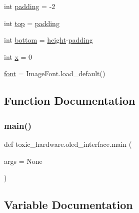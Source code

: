 \begin{DoxyCompactItemize}
int \mbox{\hyperlink{namespacetoxic__hardware_1_1oled__interface_a551f91b346cdc03bdfdb32a7a71da5d4}{padding}} = -\/2
\item 
int \mbox{\hyperlink{namespacetoxic__hardware_1_1oled__interface_a08522c6a4a076052b31d7123c3131119}{top}} = \mbox{\hyperlink{namespacetoxic__hardware_1_1oled__interface_a551f91b346cdc03bdfdb32a7a71da5d4}{padding}}
\item 
int \mbox{\hyperlink{namespacetoxic__hardware_1_1oled__interface_a046619703df951ada8a9a00b438a983c}{bottom}} = \mbox{\hyperlink{namespacetoxic__hardware_1_1oled__interface_a04ce862db440b383129c968ecb0651c6}{height}}-\/\mbox{\hyperlink{namespacetoxic__hardware_1_1oled__interface_a551f91b346cdc03bdfdb32a7a71da5d4}{padding}}
\item 
int \mbox{\hyperlink{namespacetoxic__hardware_1_1oled__interface_a011bb65915d0847fe86e5dfafef6536d}{x}} = 0
\item 
\mbox{\hyperlink{namespacetoxic__hardware_1_1oled__interface_a884f1d5a8f04b13797b90ef2007ba2b7}{font}} = Image\+Font.\+load\+\_\+default()
\end{DoxyCompactItemize}


\subsection{Function Documentation}
\mbox{\label{namespacetoxic__hardware_1_1oled__interface_accb1149d5c8c645c307fcb16452ac121}} 
\subsubsection{\texorpdfstring{main()}{main()}}
{\footnotesize\ttfamily def toxic\+\_\+hardware.\+oled\+\_\+interface.\+main (\begin{DoxyParamCaption}\item[{}]{args = {\ttfamily None} }\end{DoxyParamCaption})}



\subsection{Variable Documentation}
\mbox{\label{namespacetoxic__hardware_1_1oled__interface_a046619703df951ada8a9a00b438a983c}} 
